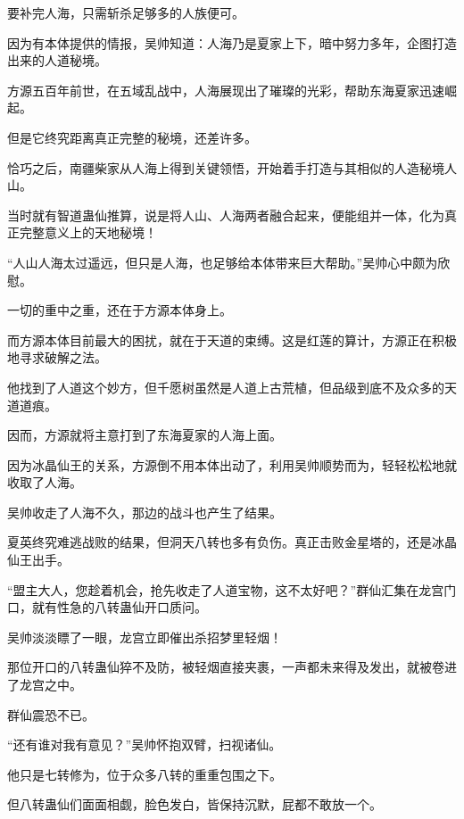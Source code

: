 \begin{this_body}
要补完人海，只需斩杀足够多的人族便可。

因为有本体提供的情报，吴帅知道：人海乃是夏家上下，暗中努力多年，企图打造出来的人道秘境。

方源五百年前世，在五域乱战中，人海展现出了璀璨的光彩，帮助东海夏家迅速崛起。

但是它终究距离真正完整的秘境，还差许多。

恰巧之后，南疆柴家从人海上得到关键领悟，开始着手打造与其相似的人造秘境人山。

当时就有智道蛊仙推算，说是将人山、人海两者融合起来，便能组并一体，化为真正完整意义上的天地秘境！

“人山人海太过遥远，但只是人海，也足够给本体带来巨大帮助。”吴帅心中颇为欣慰。

一切的重中之重，还在于方源本体身上。

而方源本体目前最大的困扰，就在于天道的束缚。这是红莲的算计，方源正在积极地寻求破解之法。

他找到了人道这个妙方，但千愿树虽然是人道上古荒植，但品级到底不及众多的天道道痕。

因而，方源就将主意打到了东海夏家的人海上面。

因为冰晶仙王的关系，方源倒不用本体出动了，利用吴帅顺势而为，轻轻松松地就收取了人海。

吴帅收走了人海不久，那边的战斗也产生了结果。

夏英终究难逃战败的结果，但洞天八转也多有负伤。真正击败金星塔的，还是冰晶仙王出手。

“盟主大人，您趁着机会，抢先收走了人道宝物，这不太好吧？”群仙汇集在龙宫门口，就有性急的八转蛊仙开口质问。

吴帅淡淡瞟了一眼，龙宫立即催出杀招梦里轻烟！

那位开口的八转蛊仙猝不及防，被轻烟直接夹裹，一声都未来得及发出，就被卷进了龙宫之中。

群仙震恐不已。

“还有谁对我有意见？”吴帅怀抱双臂，扫视诸仙。

他只是七转修为，位于众多八转的重重包围之下。

但八转蛊仙们面面相觑，脸色发白，皆保持沉默，屁都不敢放一个。

\end{this_body}

